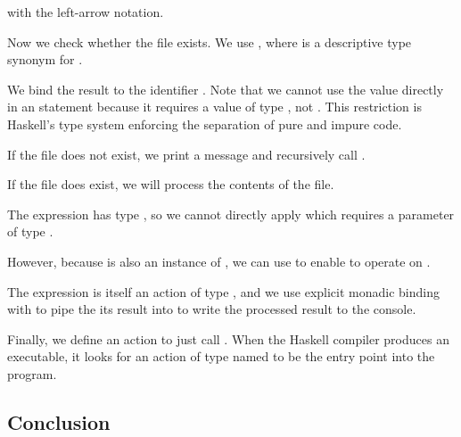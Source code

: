 \begin{notelist}
\begin{notelist}
                   with the left-arrow notation.
            \item Now we check whether the file exists. We use , where
                   is a descriptive type synonym for .
            \item We bind the result to the identifier . Note that we cannot use the value
                   directly in an  statement because it requires a value
                  of type , not . This restriction is Haskell's type system enforcing
                  the separation of pure and impure code.
            \item If the file does not exist, we print a message and recursively call .
            \item If the file does exist, we will process the contents of the file.
                \begin{notelist}
                    \item The expression  has type , so we cannot
                          directly apply  which requires a parameter of type .
                    \item However, because  is also an instance of , we can use
                          \code{(<\$>)} to enable  to operate on .
                    \item The expression  is itself an 
                          action of type , and we use explicit monadic binding with \code{(>>=)}
                          to pipe the its result into  to write the processed result
                          to the console.
                \end{notelist}
            \item Finally, we define an  action  to just call . When 
                  the Haskell compiler produces an executable, it looks for an action of type 
                  named  to be the entry point into the program.
        \end{notelist}
\end{notelist}

\subsection{Conclusion}

